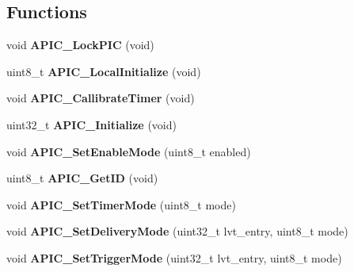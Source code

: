 \subsection*{Functions}
\begin{DoxyCompactItemize}
\item 
void {\bfseries A\+P\+I\+C\+\_\+\+Lock\+P\+IC} (void)\hypertarget{group__apic__driver_ga787bcd536ebd1d786b2738b8dd170ab1}{}\label{group__apic__driver_ga787bcd536ebd1d786b2738b8dd170ab1}

\item 
uint8\+\_\+t {\bfseries A\+P\+I\+C\+\_\+\+Local\+Initialize} (void)\hypertarget{group__apic__driver_ga6b4ef16d84cc4b546df00dd2a2bc91b5}{}\label{group__apic__driver_ga6b4ef16d84cc4b546df00dd2a2bc91b5}

\item 
void {\bfseries A\+P\+I\+C\+\_\+\+Callibrate\+Timer} (void)\hypertarget{group__apic__driver_gabac56b5509663d14592a69c6fb7030d0}{}\label{group__apic__driver_gabac56b5509663d14592a69c6fb7030d0}

\item 
uint32\+\_\+t {\bfseries A\+P\+I\+C\+\_\+\+Initialize} (void)\hypertarget{group__apic__driver_ga3025bc70eed29875a9393dcdd54cd66f}{}\label{group__apic__driver_ga3025bc70eed29875a9393dcdd54cd66f}

\item 
void {\bfseries A\+P\+I\+C\+\_\+\+Set\+Enable\+Mode} (uint8\+\_\+t enabled)\hypertarget{group__apic__driver_ga937e8b5498cf5960dcafcbc7155f6a08}{}\label{group__apic__driver_ga937e8b5498cf5960dcafcbc7155f6a08}

\item 
uint8\+\_\+t {\bfseries A\+P\+I\+C\+\_\+\+Get\+ID} (void)\hypertarget{group__apic__driver_gae55ff0bff96510ce9745d7f216379864}{}\label{group__apic__driver_gae55ff0bff96510ce9745d7f216379864}

\item 
void {\bfseries A\+P\+I\+C\+\_\+\+Set\+Timer\+Mode} (uint8\+\_\+t mode)\hypertarget{group__apic__driver_ga6c0fc8f107c7d0147b061cecb24f7a64}{}\label{group__apic__driver_ga6c0fc8f107c7d0147b061cecb24f7a64}

\item 
void {\bfseries A\+P\+I\+C\+\_\+\+Set\+Delivery\+Mode} (uint32\+\_\+t lvt\+\_\+entry, uint8\+\_\+t mode)\hypertarget{group__apic__driver_gaaa0c2c80a4f4ec4ad5d733f253da13b9}{}\label{group__apic__driver_gaaa0c2c80a4f4ec4ad5d733f253da13b9}

\item 
void {\bfseries A\+P\+I\+C\+\_\+\+Set\+Trigger\+Mode} (uint32\+\_\+t lvt\+\_\+entry, uint8\+\_\+t mode)\hypertarget{group__apic__driver_ga3d5ed977617c563f6f2a4879eea5ae4a}{}\label{group__apic__driver_ga3d5ed977617c563f6f2a4879eea5ae4a}


\end{DoxyCompactItemize}
